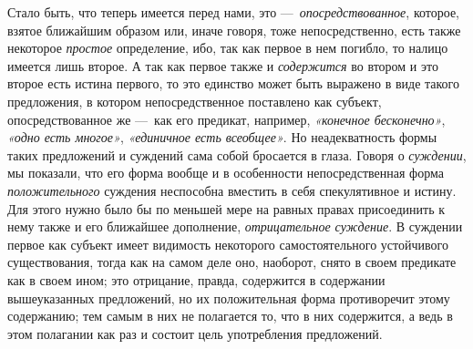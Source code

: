 \documentclass[twoside]{article}
\begin{document}
Стало быть, что теперь имеется перед нами, это
—~{\em опосредствованное},
которое, взятое ближайшим образом или, иначе говоря, тоже
непосредственно, есть также некоторое
{\em простое}
определение, ибо, так как первое в нем погибло, то налицо
имеется лишь второе. А так как первое также и
{\em содержится} во
втором и это второе есть истина первого, то это единство может быть
выражено в виде такого предложения, в котором
непосредственное поставлено как субъект, опосредствованное же
—~как его предикат, например,
{\em «конечное бесконечно»},
{\em «одно есть многое»},
{\em «единичное есть всеобщее»}.
Но неадекватность формы таких предложений и суждений сама
собой бросается в глаза. Говоря о
{\em суждении}, мы
показали, что его форма вообще и в особенности непосредственная форма
{\em положительного}
суждения неспособна вместить в себя спекулятивное и истину.
Для этого нужно было бы по меньшей мере на равных правах присоединить к
нему также и его ближайшее дополнение,
{\em отрицательное суждение}.
В суждении первое как субъект имеет видимость некоторого
самостоятельного устойчивого существования, тогда как на самом деле оно,
наоборот, снято в своем предикате как в своем ином; это отрицание,
правда, содержится в содержании вышеуказанных предложений, но их
положительная форма противоречит этому содержанию; тем самым в них не
полагается то, что в них содержится, а ведь в этом полагании как раз и
состоит цель употребления предложений.
\end{document}
